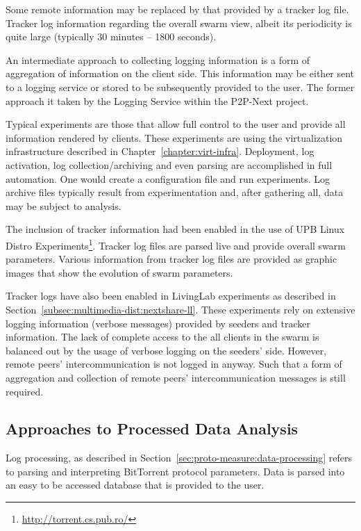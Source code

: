 Some remote information may be replaced by that provided by a tracker log
file. Tracker log information regarding the overall swarm view, albeit its
periodicity is quite large (typically 30 minutes -- 1800 seconds).

An intermediate approach to collecting logging information is a form of
aggregation of information on the client side. This information may be either
sent to a logging service or stored to be subsequently provided to the user.
The former approach it taken by the Logging Service within the P2P-Next
project.

Typical experiments are those that allow full control to the user and provide
all information rendered by clients. These experiments are using the
virtualization infrastructure described in Chapter~\ref{chapter:virt-infra}.
Deployment, log activation, log collection/archiving and even parsing are
accomplished in full automation. One would create a configuration file and run
experiments. Log archive files typically result from experimentation and, after
gathering all, data may be subject to analysis.

The inclusion of tracker information had been enabled in the use of UPB Linux
Distro Experiments\footnote{\url{http://torrent.cs.pub.ro/}}. Tracker log files are
parsed live and provide overall swarm parameters. Various information from
tracker log files are provided as graphic images that show the evolution of
swarm parameters.

Tracker logs have also been enabled in LivingLab experiments as described in
Section~\ref{subsec:multimedia-dist:nextshare-ll}. These experiments rely on
extensive logging information (verbose messages) provided by seeders and
tracker information. The lack of complete access to the all clients in the
swarm is balanced out by the usage of verbose logging on the seeders' side.
However, remote peers' intercommunication is not logged in anyway. Such that a
form of aggregation and collection of remote peers' intercommunication
messages is still required.

\subsection{Approaches to Processed Data Analysis}

Log processing, as described in
Section~\ref{sec:proto-measure:data-processing} refers to parsing and
interpreting BitTorrent protocol parameters. Data is parsed into an easy to be
accessed database that is provided to the user.


